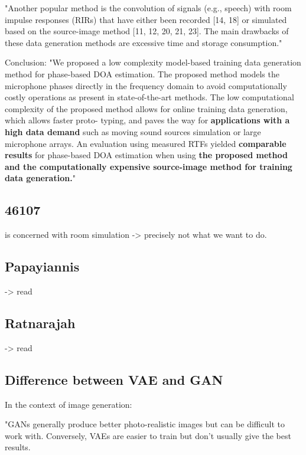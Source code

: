 \documentclass{article}
\begin{document}
"Another popular method is the convolution of signals (e.g., speech) with room impulse responses (RIRs) that have either been recorded [14, 18] or simulated based on the source-image method [11, 12, 20, 21, 23]. The main drawbacks of these data generation methods are excessive time and storage consumption."


Conclusion: 
"We proposed a low complexity model-based training data
generation method for phase-based DOA estimation. The
proposed method models the microphone phases directly
in the frequency domain to avoid computationally costly
operations as present in state-of-the-art methods. The low
computational complexity of the proposed method allows for
online training data generation, which allows faster proto-
typing, and paves the way for \textbf{applications with a high data
demand} such as moving sound sources simulation or large
microphone arrays. An evaluation using measured RTFs
yielded \textbf{comparable results} for phase-based DOA estimation
when using \textbf{the proposed method and the computationally
expensive source-image method for training data generation.}"


\subsection{46107}

\cite{46107} is concerned with room simulation -> precisely not what we want to do. 

\subsection{Papayiannis}

\cite{papayiannis2019data} -> read



\subsection{Ratnarajah}

\cite{ratnarajah2021fast} -> read






\subsection{Difference between VAE and GAN}

In the context of image generation:

"GANs generally produce better photo-realistic images but can be difficult to work with. Conversely, VAEs are easier to train but don’t usually give the best results.
\end{document}
